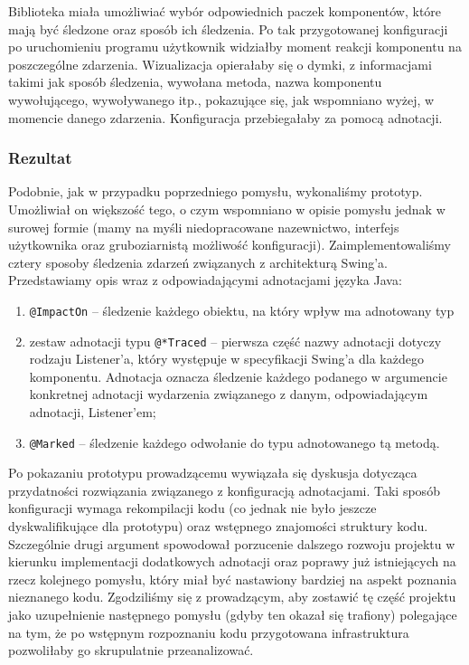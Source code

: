 \documentclass[12pt,a4paper,titlepage]{article}
\begin{document}
 Biblioteka miała umożliwiać wybór odpowiednich paczek komponentów, które mają być śledzone oraz sposób ich śledzenia. Po tak przygotowanej konfiguracji po uruchomieniu programu użytkownik widziałby moment reakcji komponentu na poszczególne zdarzenia. Wizualizacja opierałaby się o dymki, z informacjami takimi jak sposób śledzenia, wywołana metoda, nazwa komponentu wywołującego, wywoływanego itp., pokazujące się, jak wspomniano wyżej, w momencie danego zdarzenia. Konfiguracja przebiegałaby za pomocą adnotacji.
 
 \subsubsection*{Rezultat}
  Podobnie, jak w przypadku poprzedniego pomysłu, wykonaliśmy prototyp. Umożliwiał on większość tego, o czym wspomniano w opisie pomysłu jednak w surowej formie (mamy na myśli niedopracowane nazewnictwo, interfejs użytkownika oraz gruboziarnistą możliwość konfiguracji). Zaimplementowaliśmy cztery sposoby śledzenia zdarzeń związanych z architekturą Swing'a. Przedstawiamy opis wraz z odpowiadającymi adnotacjami języka Java:
  \begin{enumerate}
   \item \texttt{@ImpactOn} -- śledzenie każdego obiektu, na który wpływ ma adnotowany typ 
   \item zestaw adnotacji typu \texttt{@*Traced} -- pierwsza część nazwy adnotacji dotyczy rodzaju Listener'a, który występuje w specyfikacji Swing'a dla każdego komponentu. Adnotacja oznacza śledzenie każdego podanego w argumencie konkretnej adnotacji wydarzenia związanego z danym, odpowiadającym adnotacji, Listener'em;
   \item \texttt{@Marked} -- śledzenie każdego odwołanie do typu adnotowanego tą metodą.
  \end{enumerate}
  
  Po pokazaniu prototypu prowadzącemu wywiązała się dyskusja dotycząca przydatności rozwiązania związanego z konfiguracją adnotacjami. Taki sposób konfiguracji wymaga rekompilacji kodu (co jednak nie było jeszcze dyskwalifikujące dla prototypu) oraz wstępnego znajomości struktury kodu. Szczególnie drugi argument spowodował porzucenie dalszego rozwoju projektu w kierunku implementacji dodatkowych adnotacji oraz poprawy już istniejących na rzecz kolejnego pomysłu, który miał być nastawiony bardziej na aspekt poznania nieznanego kodu. Zgodziliśmy się z prowadzącym, aby zostawić tę część projektu jako uzupełnienie następnego pomysłu (gdyby ten okazał się trafiony) polegające na tym, że po wstępnym rozpoznaniu kodu przygotowana infrastruktura pozwoliłaby go skrupulatnie przeanalizować.
  
\end{document}
